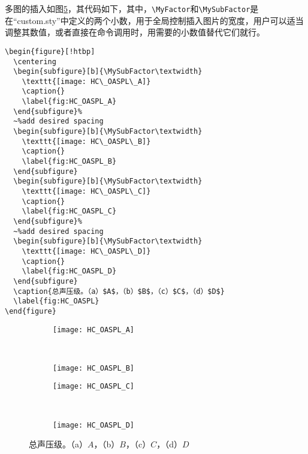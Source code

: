 多图的插入如图\ref{fig:HC_OASPL}，其代码如下，其中，\verb|\MyFactor|和\verb|\MySubFactor|是在“custom.sty”中定义的两个小数，用于全局控制插入图片的宽度，用户可以适当调整其数值，或者直接在命令调用时，用需要的小数值替代它们就行。
\begin{verbatim}
\begin{figure}[!htbp]
  \centering
  \begin{subfigure}[b]{\MySubFactor\textwidth}
    \texttt{[image: HC\_OASPL\_A]}
    \caption{}
    \label{fig:HC_OASPL_A}
  \end{subfigure}%
  ~%add desired spacing
  \begin{subfigure}[b]{\MySubFactor\textwidth}
    \texttt{[image: HC\_OASPL\_B]}
    \caption{}
    \label{fig:HC_OASPL_B}
  \end{subfigure}
  \begin{subfigure}[b]{\MySubFactor\textwidth}
    \texttt{[image: HC\_OASPL\_C]}
    \caption{}
    \label{fig:HC_OASPL_C}
  \end{subfigure}%
  ~%add desired spacing
  \begin{subfigure}[b]{\MySubFactor\textwidth}
    \texttt{[image: HC\_OASPL\_D]}
    \caption{}
    \label{fig:HC_OASPL_D}
  \end{subfigure}
  \caption{总声压级。（a）$A$，（b）$B$，（c）$C$，（d）$D$}
  \label{fig:HC_OASPL}
\end{figure}
\end{verbatim}
\begin{figure}[!htbp]
  \centering
  \begin{subfigure}[b]{\MySubFactor\textwidth}
    \texttt{[image: HC\_OASPL\_A]}
    \caption{}
    \label{fig:HC_OASPL_A}
  \end{subfigure}%
  ~%
  \begin{subfigure}[b]{\MySubFactor\textwidth}
    \texttt{[image: HC\_OASPL\_B]}
    \caption{}
    \label{fig:HC_OASPL_B}
  \end{subfigure}
  \begin{subfigure}[b]{\MySubFactor\textwidth}
    \texttt{[image: HC\_OASPL\_C]}
    \caption{}
    \label{fig:HC_OASPL_C}
  \end{subfigure}%
  ~%
  \begin{subfigure}[b]{\MySubFactor\textwidth}
    \texttt{[image: HC\_OASPL\_D]}
    \caption{}
    \label{fig:HC_OASPL_D}
  \end{subfigure}
  \caption{总声压级。（a）$A$，（b）$B$，（c）$C$，（d）$D$}
  \label{fig:HC_OASPL}
\end{figure}

